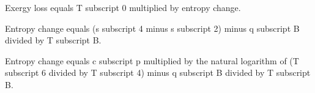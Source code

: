 Exergy loss equals T subscript 0 multiplied by entropy change.  

Entropy change equals (s subscript 4 minus s subscript 2) minus q subscript B divided by T subscript B.  

Entropy change equals c subscript p multiplied by the natural logarithm of (T subscript 6 divided by T subscript 4) minus q subscript B divided by T subscript B.